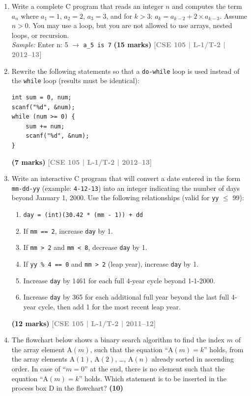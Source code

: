 \documentclass[12pt,a3paper]{article}
\newcommand{\yr}[1]{\hfill\textcolor{gray}{\small\textbf{[#1]}}}
\newcommand{\mk}[1]{\textcolor{orange!70!black}{\small\textbf{(#1 marks)}}}
\begin{document}
\begin{enumerate}
\item Write a complete C program that reads an integer $n$ and computes the term $a_n$ where $a_1=1$, $a_2=2$, $a_3=3$, and for $k>3$: $a_k = a_{k-2} + 2 \times a_{k-3}$. Assume $n > 0$. You may use a loop, but you are not allowed to use arrays, nested loops, or recursion.\\
\textit{Sample:} Enter n: 5 $\to$ \texttt{a\_5 is 7}
\mk{15} \yr{CSE 105 | L-1/T-2 | 2012--13}

\item Rewrite the following statements so that a \texttt{do-while} loop is used instead of the \texttt{while} loop (results must be identical):
 
\begin{lstlisting}
int sum = 0, num;
scanf("%d", &num);
while (num >= 0) {
    sum += num;
    scanf("%d", &num);
}
\end{lstlisting}
\mk{7} \yr{CSE 105 | L-1/T-2 | 2012--13}

\item Write an interactive C program that will convert a date entered in the form \texttt{mm-dd-yy} (example: \texttt{4-12-13}) into an integer indicating the number of days beyond January 1, 2000. Use the following relationships (valid for \texttt{yy} $\le$ 99):
\begin{enumerate}
  \item \texttt{day = (int)(30.42 * (mm - 1)) + dd}
  \item If \texttt{mm == 2}, increase \texttt{day} by 1.
  \item If \texttt{mm > 2} and \texttt{mm < 8}, decrease \texttt{day} by 1.
  \item If \texttt{yy \% 4 == 0} and \texttt{mm > 2} (leap year), increase \texttt{day} by 1.
  \item Increase \texttt{day} by 1461 for each full 4-year cycle beyond 1-1-2000.
  \item Increase \texttt{day} by 365 for each additional full year beyond the last full 4-year cycle, then add 1 for the most recent leap year.
\end{enumerate}
\mk{12} \yr{CSE 105 | L-1/T-2 | 2011--12}

\item The flowchart below shows a binary search algorithm to find the index $m$ of the array element $\text{A}(m)$, such that the equation ``$\text{A}(m) = k$'' holds, from the array elements $\text{A}(1)$, $\text{A}(2)$, \dots, $\text{A}(n)$ already sorted in ascending order. In case of ``$m = 0$'' at the end, there is no element such that the equation ``$\text{A}(m) = k$'' holds. Which statement is to be inserted in the process box D in the flowchart? \hfill \textbf{(10)}


\end{enumerate}
\end{document}
